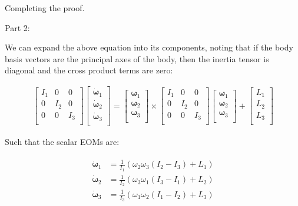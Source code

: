 \documentclass[
]{article}
\begin{document}
Completing the proof.

Part 2:

We can expand the above equation into its components, noting that if the
body basis vectors are the principal axes of the body, then the inertia
tensor is diagonal and the cross product terms are zero:

\[\begin{aligned}
\begin{bmatrix}
        I_1 & 0 & 0 \\
        0 & I_2 & 0 \\
        0 & 0 & I_3 \\
    \end{bmatrix}
    \begin{bmatrix}
        \dot{\boldsymbol{\omega}}_1 \\
        \dot{\boldsymbol{\omega}}_2 \\
        \dot{\boldsymbol{\omega}}_3 \\
    \end{bmatrix}
    =
    \begin{bmatrix}
        \boldsymbol{\omega}_1 \\
        \boldsymbol{\omega}_2 \\
        \boldsymbol{\omega}_3 \\
    \end{bmatrix}
    \times
    \begin{bmatrix}
        I_1 & 0 & 0 \\
        0 & I_2 & 0 \\
        0 & 0 & I_3 \\
    \end{bmatrix}
    \begin{bmatrix}
        \boldsymbol{\omega}_1 \\
        \boldsymbol{\omega}_2 \\
        \boldsymbol{\omega}_3 \\
    \end{bmatrix}
    +
    \begin{bmatrix}
        L_1 \\
        L_2 \\
        L_3 \\
    \end{bmatrix}
\end{aligned}\]

Such that the scalar EOMs are:

\[\begin{aligned}
\begin{aligned}
    \dot{\boldsymbol{\omega}}_1 &= \frac{1}{I_1} \left(\omega_2 \omega_3 \left(I_2 - I_3\right) + L_1 \right)\\
    \dot{\boldsymbol{\omega}}_2 &= \frac{1}{I_2} \left(\omega_3 \omega_1 \left(I_3 - I_1\right) + L_2 \right)\\
    \dot{\boldsymbol{\omega}}_3 &= \frac{1}{I_3} \left(\omega_1 \omega_2 \left(I_1 - I_2\right) + L_3 \right)\\
\end{aligned}
\end{aligned}\]
\end{document}
